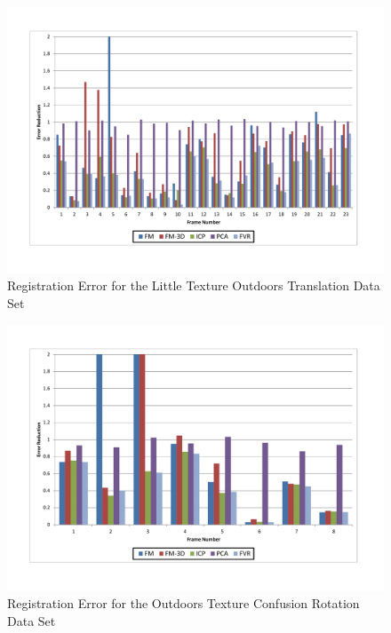 \begin{figure}[t]
\centering
\includegraphics[width=6.0in]{images/results/Outside_No_Texture_Translation}
\caption{Registration Error for the Little Texture Outdoors Translation Data Set}
\label{fig:PET14}
\end{figure}

\begin{figure}[t]
\centering
\includegraphics[width=6.0in]{images/results/Outside_TextureConfusion_Rotation}
\caption{Registration Error for the Outdoors Texture Confusion Rotation Data Set}
\label{fig:PET15}
\end{figure}

